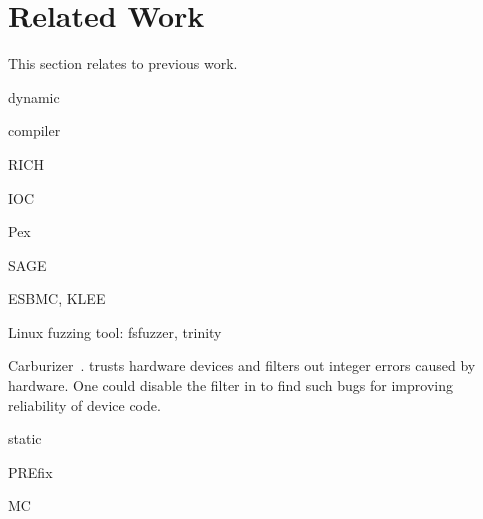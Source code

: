 \section{Related Work}
\label{s:relwk}

This section relates \sys to previous work.

dynamic

compiler

RICH~\cite{brumley:rich}

IOC

Pex

SAGE

ESBMC, KLEE

Linux fuzzing tool: fsfuzzer, trinity

Carburizer~\cite{kadav:tolerating}.
\sys trusts hardware devices and filters out integer errors
caused by hardware.  One could disable the filter in \sys
to find such bugs for improving reliability of device code.

static

PREfix~\cite{moy:prefix}

MC
